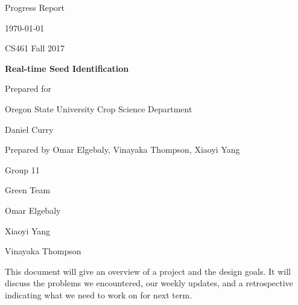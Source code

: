 \documentclass[onecolumn, draftclsnofoot,10pt, compsoc]{IEEEtran}
\def \CapstoneTeamName{			Green Team}
\def \CapstoneTeamNumber{		11}
\def \GroupMemberOne{			Omar Elgebaly}
\def \GroupMemberTwo{			Xiaoyi Yang}
\def \GroupMemberThree{			Vinayaka Thompson}
\def \CapstoneProjectName{		Real-time Seed Identification}
\def \CapstoneSponsorCompany{	Oregon State University Crop Science Department}
\def \CapstoneSponsorPerson{	Daniel Curry}
\newcommand{\NameSigPair}[1]{\par
	\makebox[2.75in][r]{#1} \hfil 	\makebox[3.25in]{\makebox[2.25in]{\hrulefill} \hfill		\makebox[.75in]{\hrulefill}}
	\par\vspace{-12pt} \textit{\tiny\noindent
		\makebox[2.75in]{} \hfil		\makebox[3.25in]{\makebox[2.25in][r]{Signature} \hfill	\makebox[.75in][r]{Date}}}}
\renewcommand{\NameSigPair}[1]{#1}
\begin{document}
	\begin{titlepage}
		\begin{singlespace}
			\hfill 
			\par\vspace{.2in}
			\centering
			\scshape{
				\huge Progress Report \par
				{\large\today}\par
				{\large CS461 Fall 2017}\par
				\vspace{.5in}
				\textbf{\Huge\CapstoneProjectName}\par
				\vfill
				{\large Prepared for}\par
				\Huge \CapstoneSponsorCompany\par
				\vspace{5pt}
				{\Large\NameSigPair{\CapstoneSponsorPerson}\par}
				{\large Prepared by Omar Elgebaly, Vinayaka Thompson, Xiaoyi Yang}\par
				Group\CapstoneTeamNumber\par
				\CapstoneTeamName\par 
				\vspace{5pt}
				{\Large
					\NameSigPair{\GroupMemberOne}\par
					\NameSigPair{\GroupMemberTwo}\par
					\NameSigPair{\GroupMemberThree}\par
				}
				\vspace{20pt}
			}
			\begin{abstract}
				
				
			\end{abstract}     
		This document will give an overview of a project and the design goals. It will discuss the problems we encountered, our weekly updates, and a retrospective indicating what we need to work on for next term.	
		\end{singlespace}
	\end{titlepage}
	\newpage
	\tableofcontents
	\clearpage
	
	
\end{document}
